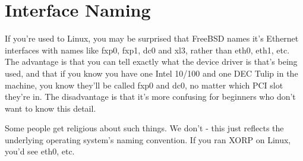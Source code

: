 \section{Interface Naming}

If you're used to Linux, you may be surprised that FreeBSD names it's
Ethernet interfaces with names like {\stt fxp0}, {\stt fxp1},
{\stt dc0} and {\stt xl3}, rather than {\stt eth0}, {\stt eth1}, etc.
The advantage is that you can tell exactly what the device driver is
that's being used, and that if you know you have one Intel 10/100 and one
DEC Tulip in the machine, you know they'll be called {\stt fxp0} and
{\stt dc0}, no matter which PCI slot they're in.  The disadvantage is
that it's more confusing for beginners who don't want to know this detail.

Some people get religious about such things.  We don't - this just
reflects the underlying operating system's naming convention.  If you
ran XORP on Linux, you'd see {\stt eth0}, etc.
